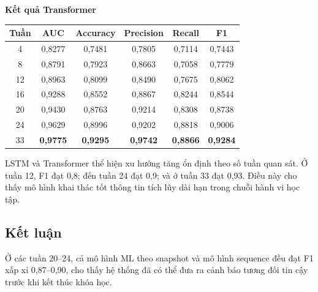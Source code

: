 \begin{center}
\small
\textbf{Kết quả Transformer}

\renewcommand{\arraystretch}{1.3}
\begin{tabular}{|c|c|c|c|c|c|}
\hline
\textbf{Tuần} & \textbf{AUC} & \textbf{Accuracy} & \textbf{Precision} & \textbf{Recall} & \textbf{F1} \\
\hline
4  & 0,8277 & 0,7481 & 0,7805 & 0,7114 & 0,7443 \\
8  & 0,8791 & 0,7923 & 0,8663 & 0,7058 & 0,7779 \\
12 & 0,8963 & 0,8099 & 0,8490 & 0,7675 & 0,8062 \\
16 & 0,9288 & 0,8552 & 0,8867 & 0,8244 & 0,8544 \\
20 & 0,9430 & 0,8763 & 0,9214 & 0,8308 & 0,8738 \\
24 & 0,9629 & 0,8996 & 0,9202 & 0,8818 & 0,9006 \\
33 & \textbf{0,9775} & \textbf{0,9295} & \textbf{0,9742} & \textbf{0,8866} & \textbf{0,9284} \\
\hline
\end{tabular}
\end{center}

LSTM và Transformer thể hiện xu hướng tăng ổn định theo số tuần quan sát. Ở tuần 12, F1 đạt 0,8; đến
tuần 24 đạt 0,9; và ở tuần 33 đạt 0,93. Điều này cho thấy mô hình khai thác tốt thông
tin tích lũy dài hạn trong chuỗi hành vi học tập.


\subsection{Kết luận}

Ở các tuần 20--24, cả mô hình ML theo snapshot và mô hình sequence đều đạt F1 xấp xỉ 0,87--0,90, cho thấy hệ thống đã có thể đưa ra cảnh báo tương đối tin cậy trước khi kết thúc khóa học.
\newpage
